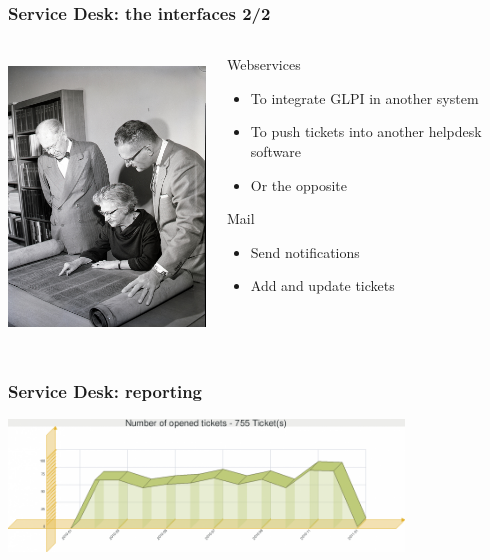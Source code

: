 \documentclass{beamer}
\begin{document}
\begin{frame}

    \frametitle{Service Desk: the interfaces 2/2}


 \begin{columns}
 \begin{column}{0.45\textwidth}
         \includegraphics[height=7.5cm]{./pics/servicedesk3.jpg}
 \end{column}
 \begin{column}{0.45\textwidth}
     \begin{block}{Webservices}
        \begin{itemize}
            \item To integrate GLPI in another system
            \item To push tickets into another helpdesk software
            \item Or the opposite
        \end{itemize}
    \end{block}
\pause
    \begin{block}{Mail}
       \begin{itemize}
            \item Send notifications
            \item Add and update tickets
       \end{itemize}
    \end{block}


 \end{column}
\end{columns}

\end{frame}

\begin{frame}

\frametitle{Service Desk: reporting}
\includegraphics[height=3.5cm]{./pics/report1.png}
\end{frame}
\end{document}
